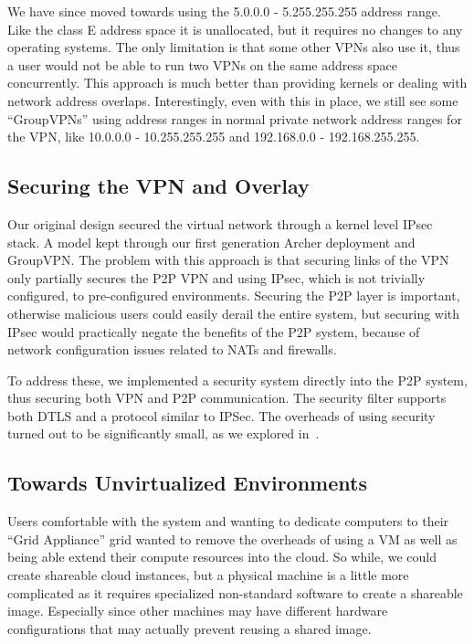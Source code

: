 \documentclass[conference]{IEEEtran}
\begin{document}
We have since moved towards using the 5.0.0.0 - 5.255.255.255 address range.
Like the class E address space it is unallocated, but it requires no changes to
any operating systems.  The only limitation is that some other VPNs also use
it, thus a user would not be able to run two VPNs on the same address space
concurrently.  This approach is much better than providing kernels or dealing
with network address overlaps.  Interestingly, even with this in place, we
still see some ``GroupVPNs''  using address ranges in normal private network
address ranges for the VPN, like 10.0.0.0 - 10.255.255.255 and 192.168.0.0 -
192.168.255.255.

\subsection{Securing the VPN and Overlay}

Our original design secured the virtual network through a kernel level IPsec
stack.  A model kept through our first generation Archer deployment and
GroupVPN.  The problem with this approach is that securing links of the VPN
only partially secures the P2P VPN and using IPsec, which is not trivially
configured, to pre-configured environments.  Securing the P2P layer is
important, otherwise malicious users could easily derail the entire system, but
securing with IPsec would practically negate the benefits of the P2P system,
because of network configuration issues related to NATs and firewalls.

To address these, we implemented a security system directly into the P2P
system, thus securing both VPN and P2P communication.  The security filter
supports both DTLS and a protocol similar to IPSec.  The overheads of using
security turned out to be significantly small, as we explored
in~\cite{groupvpn}.

\subsection{Towards Unvirtualized Environments}

Users comfortable with the system and wanting to dedicate computers to their
``Grid Appliance'' grid wanted to remove the overheads of using a VM as well as
being able extend their compute resources into the cloud.  So while, we could
create shareable cloud instances, but a physical machine is a little more
complicated as it requires specialized non-standard software to create a
shareable image.  Especially since other machines may have different hardware
configurations that may actually prevent reusing a shared image.
\end{document}
